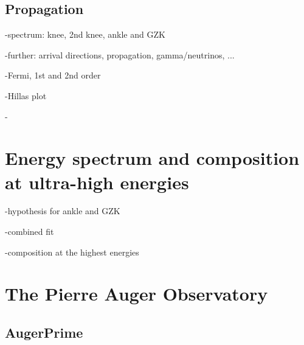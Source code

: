 \subsection{Propagation}


-spectrum: knee, 2nd knee, ankle and GZK

-further: arrival directions, propagation, gamma/neutrinos, ...

-Fermi, 1st and 2nd order

-Hillas plot

-

\section{Energy spectrum and composition at ultra-high energies}
\label{sec:uhecr:spectrum}

-hypothesis for ankle and GZK

-combined fit

-composition at the highest energies


\section{The Pierre Auger Observatory}
\label{sec:uhecr:auger}


\subsection{AugerPrime}






